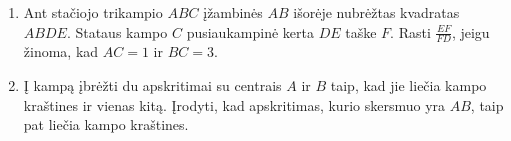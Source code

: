 \begin{enumerate}
\item Ant stačiojo trikampio $ABC$ įžambinės $AB$ išorėje
  nubrėžtas kvadratas $ABDE$. Stataus kampo $C$
  pusiaukampinė kerta $DE$ taške $F$. Rasti $\frac{EF}{FD}$,
  jeigu žinoma, kad $AC=1$ ir $BC=3$. 
\item Į kampą įbrėžti du apskritimai su centrais $A$ ir $B$
  taip, kad jie liečia kampo kraštines ir vienas kitą.
  Įrodyti, kad apskritimas, kurio skersmuo yra $AB$, taip
  pat liečia kampo kraštines.

\end{enumerate}
